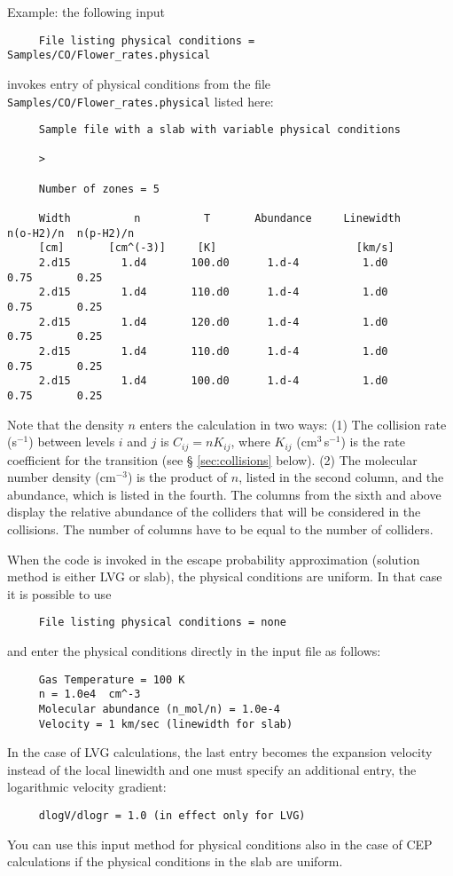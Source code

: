 \documentclass[12pt]{article}
\def\separation {0.5cm}
\begin{document}
Example: the following input
%
\smallskip
\begin{verbatim}
     File listing physical conditions = Samples/CO/Flower_rates.physical
\end{verbatim}
invokes entry of physical conditions from the file
\texttt{Samples/CO/Flower\_rates.physical} listed here:
\begin{verbatim}
     Sample file with a slab with variable physical conditions

     >

     Number of zones = 5

     Width          n          T       Abundance     Linewidth      n(o-H2)/n  n(p-H2)/n
     [cm]       [cm^(-3)]     [K]                      [km/s]
     2.d15        1.d4       100.d0      1.d-4          1.d0         0.75       0.25
     2.d15        1.d4       110.d0      1.d-4          1.d0         0.75       0.25
     2.d15        1.d4       120.d0      1.d-4          1.d0         0.75       0.25
     2.d15        1.d4       110.d0      1.d-4          1.d0         0.75       0.25
     2.d15        1.d4       100.d0      1.d-4          1.d0         0.75       0.25
\end{verbatim}
Note that the density $n$ enters the calculation in two ways: (1) The collision
rate (s$^{-1}$) between levels $i$ and $j$ is $C_{ij} = nK_{ij}$, where
$K_{ij}$ (cm$^3$\,s$^{-1}$) is the rate coefficient for the transition (see \S
\ref{sec:collisions} below). (2) The molecular number density (cm$^{-3}$) is
the product of $n$, listed in the second column, and the abundance, which is
listed in the fourth. The columns from the sixth and above display the relative abundance
of the colliders that will be considered in the collisions. The number of columns
have to be equal to the number of colliders.


When the code is invoked in the escape probability approximation (solution
method is either LVG or slab), the physical conditions are uniform. In that
case it is possible to use
%
\smallskip
\begin{verbatim}
     File listing physical conditions = none
\end{verbatim}
and enter the physical conditions directly in the input file as follows:
\vspace{\separation}
\begin{verbatim}
     Gas Temperature = 100 K
     n = 1.0e4  cm^-3
     Molecular abundance (n_mol/n) = 1.0e-4
     Velocity = 1 km/sec (linewidth for slab)
\end{verbatim}
In the case of LVG calculations, the last entry becomes the expansion velocity
instead of the local linewidth and one must specify an additional entry, the
logarithmic velocity gradient:
%
\smallskip
\begin{verbatim}
     dlogV/dlogr = 1.0 (in effect only for LVG)
\end{verbatim}
You can use this input method for physical conditions also in the case of CEP
calculations if the physical conditions in the slab are uniform.
\end{document}
